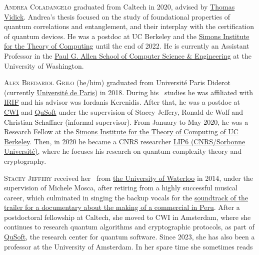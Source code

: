 \documentclass{toc}
\begin{document}
\begin{tocaboutauthors}
\begin{tocabout}[coladangelo]  \textsc{Andrea Coladangelo} graduated from Caltech in
%
  2020,  %
%
%
%
%
advised by
  \href{http://cms.caltech.edu/~vidick}{Thomas Vidick}. Andrea's thesis focused on the study of foundational properties of quantum correlations and entanglement, and their interplay with the certification of quantum devices. He was a postdoc at UC Berkeley and the \href{https://simons.berkeley.edu/}{Simons Institute for the Theory of Computing} until the end of 2022. He is currently an Assistant Professor in the \href{https://www.cs.washington.edu/}{Paul G. Allen School of Computer Science \& Engineering} at the University of Washington. 
\end{tocabout}
\begin{tocabout}[grilo]
\textsc{Alex Bredariol Grilo} (he/him) graduated from   Universit\'{e} Paris Diderot (currently   \href{https://u-paris.fr/en/}{Universit\'e de Paris}) in 2018. 
%
During his \phd\ studies   %
he was affiliated %
with %
\href{https://www.irif.fr}{IRIF} and his advisor was Iordanis Kerenidis. After that, he was a 
%
postdoc     %
at \href{https://cwi.nl}{CWI} and \href{https://qusoft.nl}{QuSoft} under the supervision of Stacey Jeffery, Ronald de Wolf and Christian Schaffner (informal supervisor). From January to May 2020, he was a Research Fellow at the \href{https://simons.berkeley.edu/}{Simons Institute for the Theory of Computing of UC Berkeley}. Then, in 2020 he became a CNRS researcher  \href{https://lip6.fr}{LIP6 (CNRS/Sorbonne Universit\'e)}, where he 
%
focuses  %
his research on quantum complexity theory and cryptography.
\end{tocabout}
\begin{tocabout}[jeffery]  \textsc{Stacey Jeffery}
  received her \phd\ from 
  \href{https://uwaterloo.ca}{the University of Waterloo} in
  2014, under the supervision of Michele Mosca, after retiring from a highly successful musical career, which culminated in singing the backup vocals for the \href{https://www.youtube.com/watch?v=S15lHGMdubI}{soundtrack of the trailer for a documentary about the making of a commercial in Peru}. After a postdoctoral fellowship at Caltech, she moved to CWI in Amsterdam, where she continues to research quantum algorithms and cryptographic protocols, as part of \href{https://qusoft.org}{QuSoft}, the research center for quantum software.  Since 2023, she has also been a professor at the University of Amsterdam.    In her spare time she sometimes reads

\end{tocabout}
\end{tocaboutauthors}
\end{document}
